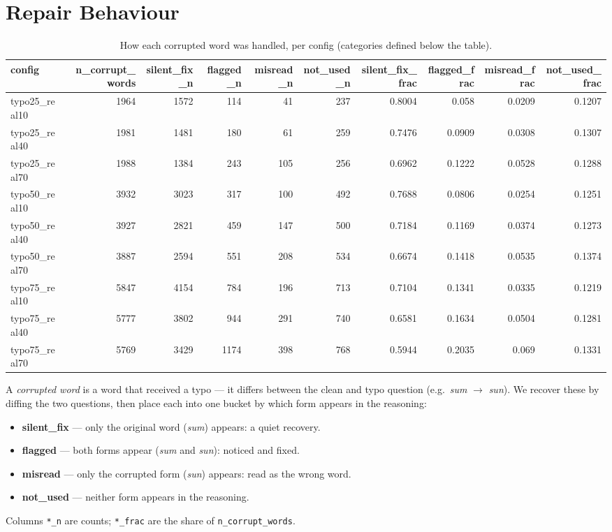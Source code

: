 \documentclass[11pt]{article}
\begin{document}
\section*{Repair Behaviour}
\begin{table}[H]
\centering
\caption{How each corrupted word was handled, per config (categories defined below the table).}
\small
\begin{adjustbox}{max width=\textwidth}
\begin{tabular}{lrrrrrrrrr}
\toprule
\textbf{config} & \textbf{n\_corrupt\_words} & \textbf{silent\_fix\_n} & \textbf{flagged\_n} & \textbf{misread\_n} & \textbf{not\_used\_n} & \textbf{silent\_fix\_frac} & \textbf{flagged\_frac} & \textbf{misread\_frac} & \textbf{not\_used\_frac} \\
\midrule
typo25\_real10 & 1964 & 1572 & 114 & 41 & 237 & 0.8004 & 0.058 & 0.0209 & 0.1207 \\
typo25\_real40 & 1981 & 1481 & 180 & 61 & 259 & 0.7476 & 0.0909 & 0.0308 & 0.1307 \\
typo25\_real70 & 1988 & 1384 & 243 & 105 & 256 & 0.6962 & 0.1222 & 0.0528 & 0.1288 \\
typo50\_real10 & 3932 & 3023 & 317 & 100 & 492 & 0.7688 & 0.0806 & 0.0254 & 0.1251 \\
typo50\_real40 & 3927 & 2821 & 459 & 147 & 500 & 0.7184 & 0.1169 & 0.0374 & 0.1273 \\
typo50\_real70 & 3887 & 2594 & 551 & 208 & 534 & 0.6674 & 0.1418 & 0.0535 & 0.1374 \\
typo75\_real10 & 5847 & 4154 & 784 & 196 & 713 & 0.7104 & 0.1341 & 0.0335 & 0.1219 \\
typo75\_real40 & 5777 & 3802 & 944 & 291 & 740 & 0.6581 & 0.1634 & 0.0504 & 0.1281 \\
typo75\_real70 & 5769 & 3429 & 1174 & 398 & 768 & 0.5944 & 0.2035 & 0.069 & 0.1331 \\
\bottomrule
\end{tabular}
\end{adjustbox}
\end{table}

\noindent A \emph{corrupted word} is a word that received a
typo --- it differs between the clean and typo question (e.g.\ \emph{sum} $\to$
\emph{sun}). We recover these by diffing the two questions, then place each into one
bucket by which form appears in the reasoning:
\begin{itemize}\setlength{\itemsep}{1pt}
  \item \textbf{silent\_fix} --- only the original word (\emph{sum}) appears: a quiet recovery.
  \item \textbf{flagged} --- both forms appear (\emph{sum} and \emph{sun}): noticed and fixed.
  \item \textbf{misread} --- only the corrupted form (\emph{sun}) appears: read as the wrong word.
  \item \textbf{not\_used} --- neither form appears in the reasoning.
\end{itemize}
\noindent Columns \texttt{*\_n} are counts; \texttt{*\_frac} are the share of
\texttt{n\_corrupt\_words}.
\medskip
\end{document}
